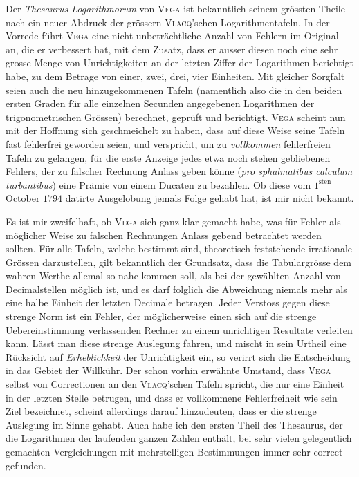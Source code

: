 Der \emph{Thesaurus Logarithmorum} von \textsc{Vega} ist bekanntlich seinem grössten
Theile nach ein neuer Abdruck der grössern \textsc{Vlacq}'schen Logarithmentafeln. In
der Vorrede führt \textsc{Vega} eine nicht unbeträchtliche Anzahl von Fehlern im Original an, die er verbessert hat, mit dem Zusatz, dass er ausser diesen noch eine
sehr grosse Menge von Unrichtigkeiten an der letzten Ziffer der Logarithmen berichtigt habe, zu dem Betrage von einer, zwei, drei, vier Einheiten. Mit gleicher Sorgfalt seien auch die neu hinzugekommenen Tafeln (namentlich also die in
den beiden ersten Graden für alle einzelnen Secunden angegebenen Logarithmen
der trigonometrischen Grössen) berechnet, geprüft und berichtigt. \textsc{Vega} scheint
nun mit der Hoffnung sich geschmeichelt zu haben, dass auf diese Weise seine
Tafeln fast fehlerfrei geworden seien, und verspricht, um zu \emph{vollkommen} fehlerfreien Tafeln zu gelangen, für die erste Anzeige jedes etwa noch stehen gebliebenen Fehlers, der zu falscher Rechnung Anlass geben könne (\emph{pro sphalmatibus calculum turbantibus}) eine Prämie von einem Ducaten zu bezahlen. Ob diese vom
$1^{\mathrm{sten}}$ October $1794$ datirte Ausgelobung jemals Folge gehabt hat, ist mir nicht
bekannt.

Es ist mir zweifelhaft, ob \textsc{Vega} sich ganz klar gemacht habe, was für Fehler als möglicher Weise zu falschen Rechnungen Anlass gebend betrachtet werden sollten. Für alle Tafeln, welche bestimmt sind, theoretisch feststehende
irrationale Grössen darzustellen, gilt bekanntlich der Grundsatz, dass die Tabulargrösse dem wahren Werthe allemal so nahe kommen soll, als bei der gewählten Anzahl von Decimalstellen möglich ist, und es darf folglich die Abweichung
niemals mehr als eine halbe Einheit der letzten Decimale betragen. Jeder Verstoss gegen diese strenge Norm ist ein Fehler, der möglicherweise einen sich auf
die strenge Uebereinstimmung verlassenden Rechner zu einem unrichtigen Resultate verleiten kann. Lässt man diese strenge Auslegung fahren, und mischt in
sein Urtheil eine Rücksicht auf \emph{Erheblichkeit} der Unrichtigkeit ein, so verirrt
sich die Entscheidung in das Gebiet der Willkühr. Der schon vorhin erwähnte
Umstand, dass \textsc{Vega} selbst von Correctionen an den \textsc{Vlacq}'schen Tafeln spricht,
die nur eine Einheit in der letzten Stelle betrugen, und dass er vollkommene Fehlerfreiheit wie sein Ziel bezeichnet, scheint allerdings darauf hinzudeuten, dass
er die strenge Auslegung im Sinne gehabt. Auch habe ich den ersten Theil des
Thesaurus, der die Logarithmen der laufenden ganzen Zahlen enthält, bei sehr
vielen gelegentlich gemachten Vergleichungen mit mehrstelligen Bestimmungen
immer sehr correct gefunden.

